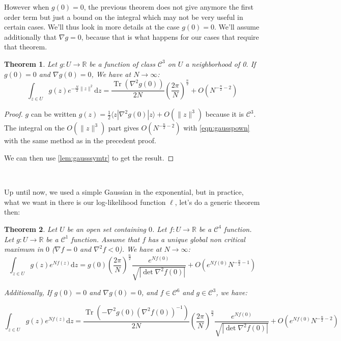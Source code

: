\documentclass[10pt,a4paper]{report}
\theoremstyle{plain}
\newtheorem{thm}{Theorem}[chapter]
\theoremstyle{definition}
\theoremstyle{remark}
\newcommand{\R}{\ensuremath{\mathbb{R}}}
\newcommand{\ket}[1]{|#1\rangle}
\newcommand{\bra}[1]{\langle#1|}
\newcommand{\dd}{\mathrm{d}}
\DeclareMathOperator{\Tr}{Tr}
\newcommand{\class}[1]{{\mathscr{C}^{#1}}}
\begin{document}
However when $g(0) = 0$, the previous theorem does not give anymore the first
order term but just a bound on the integral which may not be very useful in
certain cases. We'll thus look in more details at the case $g(0) = 0$. We'll
assume additionally that $\nabla g = 0$, because that is what happens for our
cases that require that theorem.


\begin{thm}\label{thm:asy2}
 Let $g : U \to \R$ be a function of class $\class 3$ on $U$ a neighborhood of 0. If $g(0) = 0$
 and $\nabla g(0) = 0$, We have at $N \to \infty$:
  \[\int_{z \in U} g(z)e^{-\frac N2\|z\|^2} \dd z = \frac{\Tr(\nabla^2 g(0))}{2N} {\left(\frac
        {2\pi}{N}\right)}^{\frac n 2} +
    O\left({N^{-\frac n 2 -2}}\right)\]
\end{thm}

\begin{proof}
  $g$ can be written $g(z) = \frac12\bra z \nabla^2 g(0) \ket z + O(\|z\|^3)$ because it
  is $\class 3$. The integral on the $O(\|z\|^3)$ part gives $O\left({N^{-\frac
        n 2 -2}}\right)$ with \cref{eqn:gausspown} with the same method as in
  the precedent proof.

  We can then use \cref{lem:gausssymtr} to get the result.
\end{proof}

\

Up until now, we used a simple Gaussian in the exponential, but in practice,
what we want in there is our log-likelihood function $\ell$, let's do a generic
theorem then:

\begin{thm}\label{thm:asymid}
  Let $U$ be an open set containing $0$. Let $f : U \to \R$ be a $\class 4$ function.
  Let $g : U \to \R$ be a $\class 1$ function.
  Assume that $f$ has a unique global non critical maximum in $0$
  ($\nabla f = 0$ and $\nabla^2 f < 0$). We have at $N \to \infty$:
  \[\int_{z \in U} g(z)e^{Nf(z)} \dd z = g(0)
    {\left(\frac {2\pi}{N}\right)}^{\frac n 2}
    \frac {e^{Nf(0)}}{\sqrt{\left|\det \nabla^2 f(0)\right|}}
    + O(e^{Nf(0)} N^{-\frac n 2 -1})\]

  Additionally, If $g(0) = 0$ and $\nabla g(0) = 0$, and $f \in \class 6$ and $g
  \in \class 3$, we have:

  \[\int_{z \in U} g(z)e^{N f(z)} \dd z =
    \frac{\Tr\left(-\nabla^2 g(0) {\left(\nabla^2 f(0)\right)}^{-1}\right)}{2N}
    {\left(\frac {2\pi}{N}\right)}^{\frac n 2}
    \frac {e^{Nf(0)}}{\sqrt{\left|\det \nabla^2 f(0)\right|}}
    + O\left(e^{Nf(0)}{N^{-\frac n 2 -2}}\right)\]
\end{thm}
\end{document}
